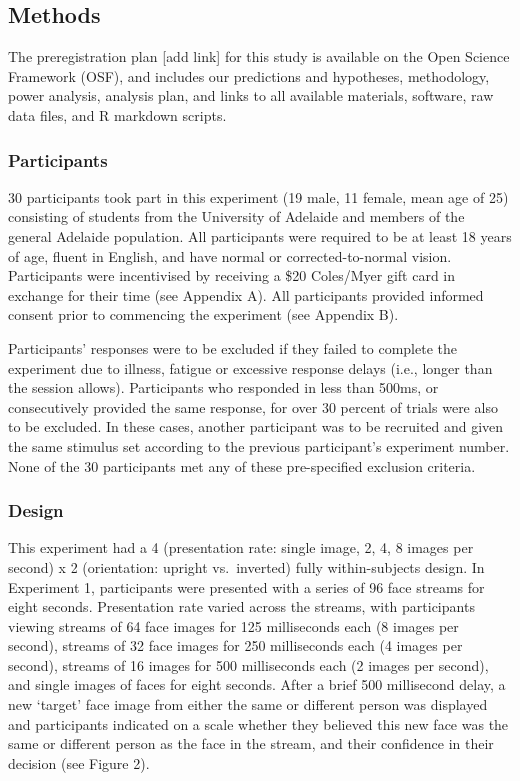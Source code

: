 \documentclass[
  english,
  man]{apa6}
\begin{document}
\hypertarget{methods}{%
\subsection{Methods}\label{methods}}

The preregistration plan {[}add link{]} for this study is available on the Open Science Framework (OSF), and includes our predictions and hypotheses, methodology, power analysis, analysis plan, and links to all available materials, software, raw data files, and R markdown scripts.

\hypertarget{participants}{%
\subsubsection{Participants}\label{participants}}

30 participants took part in this experiment (19 male, 11 female, mean age of 25) consisting of students from the University of Adelaide and members of the general Adelaide population. All participants were required to be at least 18 years of age, fluent in English, and have normal or corrected-to-normal vision. Participants were incentivised by receiving a \$20 Coles/Myer gift card in exchange for their time (see Appendix A). All participants provided informed consent prior to commencing the experiment (see Appendix B).

Participants' responses were to be excluded if they failed to complete the experiment due to illness, fatigue or excessive response delays (i.e., longer than the session allows). Participants who responded in less than 500ms, or consecutively provided the same response, for over 30 percent of trials were also to be excluded. In these cases, another participant was to be recruited and given the same stimulus set according to the previous participant's experiment number. None of the 30 participants met any of these pre-specified exclusion criteria.

\hypertarget{design}{%
\subsubsection{Design}\label{design}}

This experiment had a 4 (presentation rate: single image, 2, 4, 8 images per second) x 2 (orientation: upright vs.~inverted) fully within-subjects design. In Experiment 1, participants were presented with a series of 96 face streams for eight seconds. Presentation rate varied across the streams, with participants viewing streams of 64 face images for 125 milliseconds each (8 images per second), streams of 32 face images for 250 milliseconds each (4 images per second), streams of 16 images for 500 milliseconds each (2 images per second), and single images of faces for eight seconds. After a brief 500 millisecond delay, a new `target' face image from either the same or different person was displayed and participants indicated on a scale whether they believed this new face was the same or different person as the face in the stream, and their confidence in their decision (see Figure 2).
\end{document}
